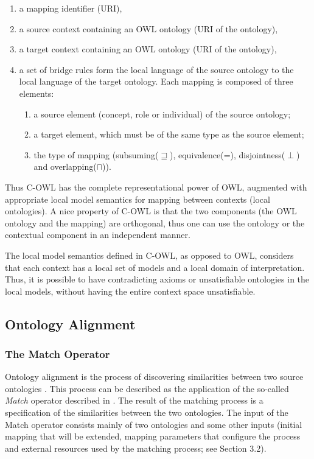 \documentclass{fast_latex}
\begin{document}
\begin{enumerate}
\item a mapping identifier (URI), 
\item a source context containing an OWL ontology (URI of the ontology),

\item a target context containing an OWL ontology (URI of the ontology),

\item a set of bridge rules form the local language of the source
ontology to the local language of the target ontology. Each mapping is
composed of three elements: 

\begin{enumerate}
\item a source element (concept, role or individual) of the source
ontology; 
\item a target element, which must be of the same type as the source
element; 
\item the type of mapping (subsuming($\sqsupseteq$), equivalence(=), disjointness($\perp$) and
overlapping($\sqcap$)). 
\end{enumerate}
\end{enumerate}
Thus C-OWL has the complete representational power of OWL, augmented
with appropriate local model semantics for mapping between contexts
(local ontologies). A nice property of C-OWL is that the two components
(the OWL ontology and the mapping) are orthogonal, thus one can use the
ontology or the contextual component in an independent manner. 

The local model semantics defined in C-OWL, as opposed to OWL, considers
that each context has a local set of models and a local domain of
interpretation. Thus, it is possible to have contradicting axioms or
unsatisfiable ontologies in the local models, without having the entire
context space unsatisfiable. 

\subsection{Ontology Alignment}
\label{subsec:mediationapproaches_ontologyalignment}
\subsubsection{The Match Operator}
Ontology alignment is the process of discovering similarities between
two source ontologies \cite{debruin2005wsml}. This process can be
described as the application of the so-called \textit{Match} operator
described in \cite{rahm01survey}. The result of the matching
process is a specification of the similarities between the two
ontologies. The input of the Match operator consists mainly of two
ontologies and some other inputs (initial mapping that will be
extended, mapping parameters that configure the process and external
resources used by the matching process; see Section 3.2). 
\end{document}
